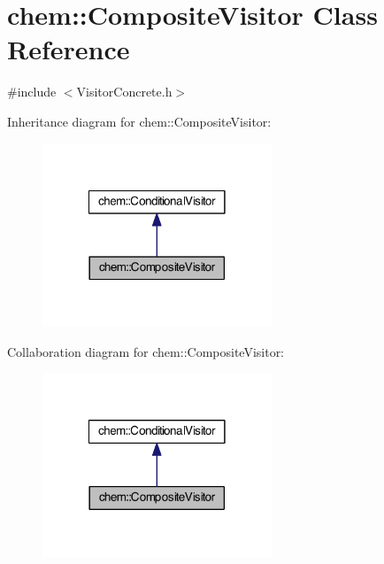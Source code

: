 \hypertarget{classchem_1_1CompositeVisitor}{\section{chem\-:\-:Composite\-Visitor Class Reference}
\label{classchem_1_1CompositeVisitor}
}


{\ttfamily \#include $<$Visitor\-Concrete.\-h$>$}



Inheritance diagram for chem\-:\-:Composite\-Visitor\-:\nopagebreak
\begin{figure}[H]
\begin{center}
\leavevmode
\includegraphics[width=194pt]{classchem_1_1CompositeVisitor__inherit__graph}
\end{center}
\end{figure}


Collaboration diagram for chem\-:\-:Composite\-Visitor\-:\nopagebreak
\begin{figure}[H]
\begin{center}
\leavevmode
\includegraphics[width=194pt]{classchem_1_1CompositeVisitor__coll__graph}
\end{center}
\end{figure}
